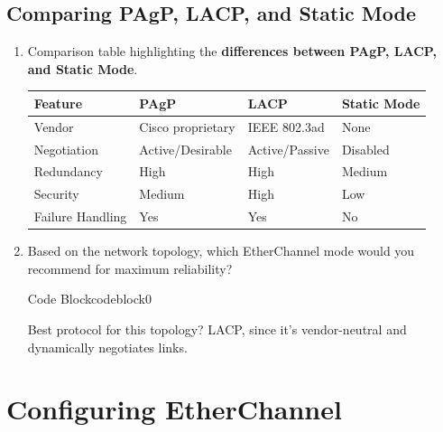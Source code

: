 \documentclass[a4paper]{article}
\begin{document}
\subsection{Comparing PAgP, LACP, and Static Mode}
\begin{enumerate}
	\item Comparison table highlighting the \textbf{differences between PAgP, LACP, and Static Mode}.

	      \begin{tabular}{|l|l|l|l|}
		      \hline
		      Feature          & PAgP              & LACP           & Static Mode \\
		      \hline
		      Vendor           & Cisco proprietary & IEEE 802.3ad   & None        \\
		      Negotiation      & Active/Desirable  & Active/Passive & Disabled    \\
		      Redundancy       & High              & High           & Medium      \\
		      Security         & Medium            & High           & Low         \\
		      Failure Handling & Yes               & Yes            & No          \\
		      \hline
	      \end{tabular}

	\item Based on the network topology, which EtherChannel mode would you recommend for maximum reliability?


	      \begin{ocg}{Code Block}{codeblock}{0}

		      \vspace{0.5cm}
		      \begin{tcolorbox}
			      Best protocol for this topology? LACP, since it’s vendor-neutral and dynamically negotiates links.
		      \end{tcolorbox}
		      \vspace{0.5cm}
	      \end{ocg}
\end{enumerate}

\section{Configuring EtherChannel}
\end{document}
